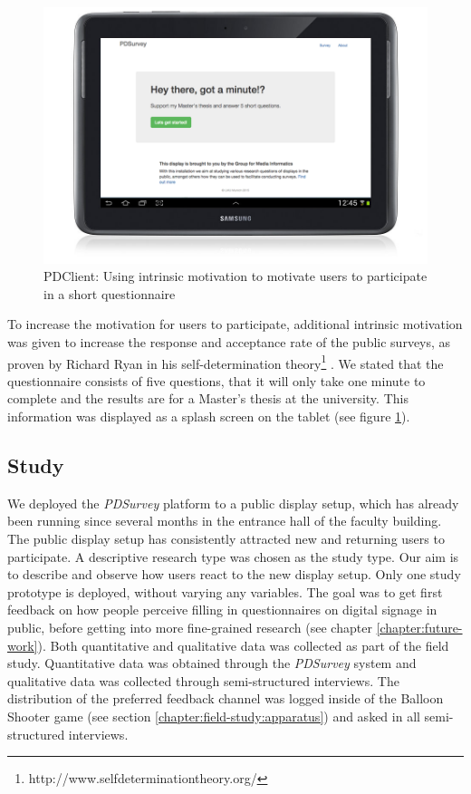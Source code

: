 	\begin{figure}
	    \begin{center}
	        \includegraphics[width=.7\columnwidth]{img/5_field-study/pdclient-startscreen.png}
	    \end{center}
	 \caption{PDClient: Using intrinsic motivation to motivate users to participate in a short questionnaire}
	 \label{fig:5-pdclient-intro}
	\end{figure}
	

	To increase the motivation for users to participate, additional intrinsic motivation was given to increase the response and acceptance rate of the public surveys, as proven by Richard Ryan in his self-determination theory\footnote{http://www.selfdeterminationtheory.org/} \cite{ryan2000self}. We stated that the questionnaire consists of five questions, that it will only take one minute to complete and the results are for a Master's thesis at the university. This information was displayed as a splash screen on the tablet (see figure \ref{fig:5-pdclient-intro}).



	



\clearpage
\subsection{Study}

	We deployed the \textit{PDSurvey} platform to a public display setup, which has already been running since several months in the entrance hall of the faculty building. The public display setup has consistently attracted new and returning users to participate. 
	A descriptive research type was chosen as the study type. Our aim is to describe and observe how users react to the new display setup. Only one study prototype is deployed, without varying any variables. The goal was to get first feedback on how people perceive filling in questionnaires on digital signage in public, before getting into more fine-grained research (see chapter \ref{chapter:future-work}). 
	Both quantitative and qualitative data was collected as part of the field study. Quantitative data was obtained through the \textit{PDSurvey} system and qualitative data was collected through semi-structured interviews.
	The distribution of the preferred feedback channel was logged inside of the Balloon Shooter game (see section \ref{chapter:field-study:apparatus}) and asked in all semi-structured interviews.


